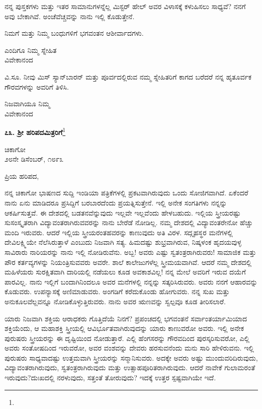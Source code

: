 ನನ್ನ ಪುಸ್ತಕಗಳು ಮತ್ತು ಇತರ ಸಾಮಾನುಗಳನ್ನೆಲ್ಲ ಮಿಸ್ಟರ್ ಹೇಲ್ ಅವರ ವಿಳಾಸಕ್ಕೆ ಕಳುಹಿಸಲು ಸಾಧ್ಯವೆ? ನನಗೆ ಅವು ಬೇಕಾಗಿವೆ. ಅಂಚೆವೆಚ್ಚವನ್ನು ನಾನು ಇಲ್ಲಿ ಕೊಡುತ್ತೇನೆ.

ನಿಮಗೆ ಮತ್ತು ನಿಮ್ಮ ಬಂಧುಗಳಿಗೆ ಭಗವಂತನ ಆಶೀರ್ವಾದಗಳು.

\begin{flushright}
ಎಂದಿಗೂ ನಿಮ್ಮ ಸ್ನೇಹಿತ\\ವಿವೇಕಾನಂದ
\end{flushright}

ವಿ.ಸೂ. \enginline{-}ನೀವು ಮಿಸ್ ಸ್ಯಾನ್‌ಬಾರನ್ ಮತ್ತು ಪೂರ್ವದಲ್ಲಿರುವ ನಮ್ಮ ಸ್ನೇಹಿತರಿಗೆ ಕಾಗದ ಬರೆದರೆ ನನ್ನ ಹೃತೂರ್ವಕ ಗೌರವಗಳನ್ನು ಅವರಿಗೆ ತಿಳಿಸಿ.

{\flushright
ನಿಜವಾಗಿಯೂ ನಿಮ್ಮ\\ವಿವೇಕಾನಂದ\par}

\begin{center}
\textbf{೭೩. ಶ‍್ರೀ ಹರಿಪದಮಿತ್ರರಿಗೆ}\footnote{}
\end{center}

\begin{flushright}
ಚಿಕಾಗೋ\\೨೮ನೇ ಡಿಸೆಂಬರ್, ೧೮೯೩
\end{flushright}

\noindent
ಪ್ರಿಯ ಹರಿಪದ,

ನನ್ನ ಚಿಕಾಗೋ ಭಾಷಣದ ಸುದ್ದಿ ಇಂಡಿಯಾ ಪತ್ರಿಕೆಗಳಲ್ಲಿ ಪ್ರಕಟವಾಗಿರುವುದು ಒಂದು ಸೋಜಿಗವಾಗಿದೆ. ಏಕೆಂದರೆ ನಾನು ಏನು ಮಾಡಿದರೂ ಪ್ರಸಿದ್ದಿಗೆ ಬರಬಾರದೆಂದು ಪ್ರಯತ್ನಿಸುತ್ತೇನೆ. ಇಲ್ಲಿ ಅನೇಕ ಸಂಗತಿಗಳು ನನ್ನನ್ನು ಆಕರ್ಷಿಸುತ್ತವೆ. ಈ ದೇಶದಲ್ಲಿ ಬಡತನವೆನ್ನುವುದು ಇಲ್ಲವೇ ಇಲ್ಲವೆಂದು ಹೇಳಬಹುದು. ಇಲ್ಲಿಯ ಸ್ತ್ರೀಯರಷ್ಟು ಸುಸಂಸ್ಕೃತರಾಗಿ ವಿದ್ಯಾವಂತರಾಗಿರುವವರನ್ನು ನಾನು ಬೇರೆಡೆ ನೋಡಿಲ್ಲ. ನಮ್ಮ ದೇಶದಲ್ಲಿ ವಿದ್ಯಾವಂತರೇನೋ ಹೆಚ್ಚು ಮಂದಿ ಇರುವರು. ಆದರೆ ಇಲ್ಲಿಯ ಸ್ತ್ರೀಯರಂತಹವರನ್ನು ಕಾಣುವುದು ಅತಿ ವಿರಳ. ಸದ್ಗೃಹಸ್ಥರ ಮನೆಗಳಲ್ಲಿ ದೇವಿಲಕ್ಷ್ಮಿಯೇ ನೆಲೆಸಿರುತ್ತಾಳೆ ಎಂಬುದು ನಿಜವಾಗಿ ಸತ್ಯ. ಹಿಮದಷ್ಟು ಶುಭ್ರವಾಗಿರುವ, ನಿಷ್ಕಳಂಕ ಹೃದಯವುಳ್ಳ ಸಾವಿರಾರು ನಾರಿಯರನ್ನು ನಾನು ಇಲ್ಲಿ ನೋಡಿರುವೆನು. ಅಬ್ಬ! ಅವರು ಎಷ್ಟು ಸ್ವತಂತ್ರರಾಗಿರುವರು! ಸಾಮಾಜಿಕ ಮತ್ತು ಪೌರ ಕರ್ತವ್ಯಗಳನ್ನು ನಿಯಂತ್ರಿಸುವವರು ಅವರೇ. ಶಾಲೆ ಕಾಲೇಜುಗಳೆಲ್ಲ ಸ್ತ್ರೀಮಯವಾಗಿವೆ. ಆದರೆ ನಮ್ಮ ದೇಶದಲ್ಲಿ ಮಹಿಳೆಯರು ಸುರಕ್ಷಿತವಾಗಿ ದಾರಿಯಲ್ಲಿ ನಡೆಯಲು ಕೂಡ ಅವಕಾಶವಿಲ್ಲ! ನನ್ನ ಮೇಲೆ ಅವರಿಗೆ ಇರುವ ದಯೆಗೆ ಪಾರವಿಲ್ಲ. ನಾನು ಇಲ್ಲಿಗೆ ಬಂದಾಗಿನಿಂದಲೂ ಅವರ ಮನೆಗಳಲ್ಲಿ ನನ್ನನ್ನು ಸತ್ಕರಿಸಿರುವರು. ಅವರು ನನಗೆ ಆಹಾರವನ್ನು ಕೊಡುವರು. ಉಪನ್ಯಾಸಕ್ಕೆ ಅಣಿಮಾಡುವರು. ಅಂಗಡಿಗೆ ಕರೆದುಕೊಂಡು ಹೋಗುವರು. ನನ್ನ ಸುಖ ಮತ್ತು ಅನುಕೂಲವೆಲ್ಲವನ್ನೂ ನೋಡಿಕೊಳ್ಳುತ್ತಿರುವರು. ನಾನು ಅವರ ಋಣವನ್ನು ಸ್ವಲ್ಪವೂ ಕೂಡ ತೀರಿಸಲಾರೆ.

ಯಾರು ನಿಜವಾಗಿ ಶಕ್ತಿಯ ಆರಾಧಕರು ಗೊತ್ತಿದೆಯೆ ನಿನಗೆ? ಪ್ರಪಂಚದಲ್ಲಿ ಭಗವಂತನೆ ಸರ್ವಾಂತರ್ಯಾಮಿಯಾದ ಶಕ್ತಿಯೆಂದು, ಆ ಮಹಾಶಕ್ತಿ ಸ್ತ್ರೀಯಲ್ಲಿ ಆವಿರ್ಭೂತವಾಗಿರುವುದನ್ನು ಯಾರು ಕಾಣುವರೋ ಅವರು. ಇಲ್ಲಿ ಅನೇಕ ಪುರುಷರು ಸ್ತ್ರೀಯರನ್ನು ಈ ದೃಷ್ಟಿಯಿಂದ ನೋಡುತ್ತಾರೆ. ಎಲ್ಲಿ ಹೆಂಗಸರನ್ನು ಗೌರವದಿಂದ ಪುರಸ್ಕರಿಸುವರೋ, ಎಲ್ಲಿ ಅವರು ಸಂತೋಷದಿಂದ ಇರುವರೋ, ಅವರ ವಂಶವನ್ನು ದೇವರು ಹರಸುವನೆಂದು ಮನು ಸಾರಿ ಹೇಳಿರುವನು. ಇಲ್ಲಿ ಪುರುಷರು ಸಾಧ್ಯವಾದಷ್ಟು ಉತ್ತಮವಾಗಿ ಸ್ತ್ರೀಯರನ್ನು ಸನ್ಮಾನಿಸುವರು. ಅದಕ್ಕೇ ಅವರು ಅಷ್ಟು ಮುಂದುವರಿದಿರುವುದು, ವಿದ್ಯಾವಂತರಾಗಿರುವುದು, ಸ್ವತಂತ್ರರಾಗಿರುವುದು ಮತ್ತು ಉತ್ಸಾಹಪೂರಿತರಾಗಿರುವುದು. ಆದರೆ ನಾವೇಕೆ ಗುಲಾಮರಂತೆ ಇರುವುದು?ದುಃಖದಲ್ಲಿ ನರಳುವುದು, ಸತ್ತಂತೆ ತೋರುವುದು? ಇದಕ್ಕೆ ಉತ್ತರ ಸ್ಪಷ್ಟವಾಗಿಯೇ ಇದೆ.

